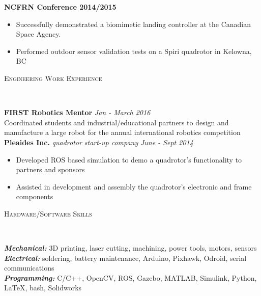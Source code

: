 \documentclass[9pt]{article}
\newenvironment{changemargin}[2]{%
  \begin{list}{}{%
    \setlength{\topsep}{0pt}%
    \setlength{\leftmargin}{#1}%
    \setlength{\rightmargin}{#2}%
    \setlength{\listparindent}{\parindent}%
    \setlength{\itemindent}{\parindent}%
    \setlength{\parsep}{\parskip}%
  }%
  \item[]}{\end{list}
}
\newcommand{\lineover}{
	\begin{changemargin}{-0.05in}{-0.05in}
		\vspace*{-8pt}
		\hrulefill \\
		\vspace*{-2pt}
	\end{changemargin}
}
\newcommand{\header}[1]{
	\begin{changemargin}{-0.5in}{-0.5in}
		\scshape{#1}\\
  	\lineover
	\end{changemargin}
}
\newenvironment{body} {
	\vspace*{-16pt}
	\begin{changemargin}{-0.25in}{-0.5in}
  }	
	{\end{changemargin}
}
\begin{document}
\begin{body}
	\vspace{14pt}
	\textbf{NCFRN Conference 2014/2015}
	\vspace*{-4pt}
	\begin{itemize} \itemsep -0pt  %
		\item Successfully demonstrated a biomimetic landing controller at the Canadian Space Agency.
		\item Performed outdoor sensor validation tests on a Spiri quadrotor in Kelowna, BC
	\end{itemize}
\end{body}
\bigskip


\header{Engineering Work Experience}

\begin{body}
	\vspace{14pt}

	\textbf{FIRST Robotics Mentor} \hfill {} \emph{Jan - March 2016}\\
	Coordinated students and industrial/educational partners to design and manufacture a large robot for the annual international robotics competition \\
	\medskip
	\vspace{14pt}
	\textbf{Pleaides Inc.} \emph{quadrotor start-up company} \hfill \emph{June - Sept 2014}\\
	\vspace*{-4pt}
	\begin{itemize} \itemsep -0pt  %

		\item Developed ROS based simulation to demo a quadrotor's functionality to partners and sponsors
		\item Assisted in development and assembly the quadrotor's electronic and frame components
		
	\end{itemize}
\end{body}

\bigskip


\header{Hardware/Software Skills}

\begin{body}
	\vspace{14pt}
	\emph{\textbf{Mechanical:}}{} 3D printing, laser cutting, machining, power tools, motors, sensors\\
	\medskip
	\emph{\textbf{Electrical:}}{} soldering, battery maintenance, Arduino, Pixhawk, Odroid, serial communications \\
	\medskip
	\emph{\textbf{Programming:}}{} C/C++, OpenCV, ROS, Gazebo,  MATLAB, Simulink, Python, \LaTeX, bash, Solidworks\\
\end{body}
\end{document}
